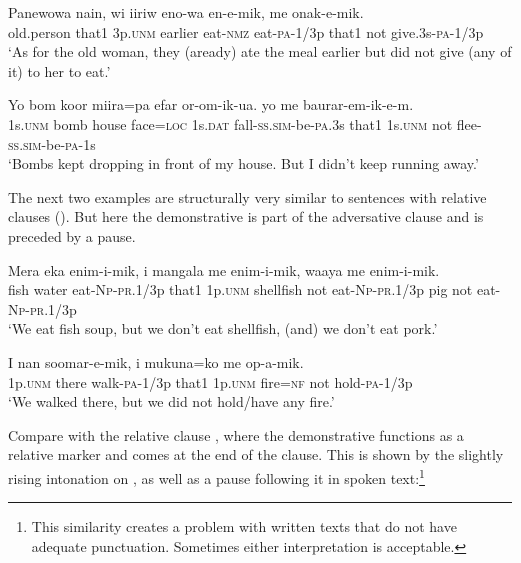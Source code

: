 \ea%
\label{ex:8:x1395}
\gll Panewowa  nain,  wi  iiriw  eno-wa  en-e-mik,    me onak-e-mik.\\
old.person  that1  3p.\textsc{unm}  earlier  eat-\textsc{nmz}  eat-\textsc{pa}-1/3p  that1  not give.3s-\textsc{pa}-1/3p\\
\glt`As for the old woman, they (aready) ate the meal earlier but did not give (any of it) to her to eat.'
\z


\ea%
\label{ex:8:x728}
\gll Yo  bom  koor  miira=pa  efar  or-om-ik-ua.   yo  me  baurar-em-ik-e-m. \\
1s.\textsc{unm}  bomb  house  face=\textsc{loc}  1s.\textsc{dat}  fall-\textsc{ss}.\textsc{sim}-be-\textsc{pa}.3s that1  1s.\textsc{unm}  not flee-\textsc{ss}.\textsc{sim}-be-\textsc{pa}-1s     \\
\glt`Bombs kept dropping in front of my house. But I didn't keep running away.'
\z


The next two examples are structurally very similar to sentences with relative clauses (). But here the demonstrative  is part of the adversative clause and is preceded by a pause. 

\ea%
\label{ex:8:x1389}
\gll Mera  eka  enim-i-mik,    i  mangala me  enim-i-mik,  waaya  me  enim-i-mik.\\
fish  water  eat-\textsc{Np}-\textsc{pr}.1/3p  that1  1p.\textsc{unm}  shellfish not  eat-\textsc{Np}-\textsc{pr}.1/3p  pig  not  eat-\textsc{Np}-\textsc{pr}.1/3p\\
\glt`We eat fish soup, but we don't eat shellfish, (and) we don't eat pork.'
\z


\ea%
\label{ex:8:x1394}
\gll I  nan  soomar-e-mik,    i  mukuna=ko  me op-a-mik.\\
1p.\textsc{unm}  there  walk-\textsc{pa}-1/3p  that1  1p.\textsc{unm}  fire=\textsc{nf} not hold-\textsc{pa}-1/3p     \\
\glt`We walked there, but we did not hold/have any fire.'
\z


Compare  with the relative clause , where the demonstrative functions as a relative marker and comes at the end of the clause. This is shown by the slightly rising intonation on , as well as a pause following it in spoken text:\footnote{This similarity creates a problem with written texts that do not have adequate punctuation. Sometimes either interpretation is acceptable.} 

